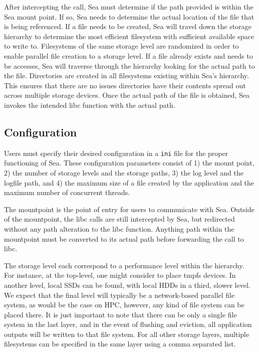 \documentclass{report}
\begin{document}
   After intercepting the call, Sea must determine if the path provided is within the
   Sea mount point. If so, Sea needs to determine the actual location of the file 
   that is being referenced. If a file needs to be created, Sea will travel
   down the storage hierarchy to determine the most efficient filesystem with sufficient
   available space to write to. Filesystems of the same storage level are randomized in
   order to enable parallel file creation to a storage level. If a file already
   exists and needs to be accesses, Sea will traverse through
   the hierarchy looking for the actual path to the file. Directories are created
   in all filesystems existing within Sea's hierarchy. This ensures that there are
   no issues directories have their contents spread out across multiple storage devices.
   Once the actual path of the file is obtained, Sea invokes the intended libc
   function with the actual path.

   \subsection{Configuration}\label{subs:configuration}
   Users must specify their desired configuration in a \texttt{ini} file for the
   proper functioning of Sea. These configuration parameters consist of 1) the
   mount point, 2) the number of storage levels and the storage paths, 3) the log level and
   the logfile path, and 4) the maximum size of a file created by the application and
   the maximum number of concurrent threads.


   The mountpoint is the point of entry for users to communicate with Sea. Outside of
   the mountpoint, the libc calls are still intercepted by Sea, but redirected without
   any path alteration to the libc function. Anything path within the mountpoint 
   must be converted to its actual path before forwarding the call to libc.


   The storage level each correspond to a performance level within the hierarchy. For
   instance, at the top-level, one might consider to place tmpfs devices. In another level,
   local SSDs can be found, with local HDDs in a third, slower level. We expect that the
   final level will typically be a network-based parallel file system, as would be the case
   on HPC, however, any kind of file system can be placed there. It is just important
   to note that there can be only a single file system in the last layer, and in the event
   of flushing and eviction, all application outputs will be written to that file system.
   For all other storage layers, multiple filesystems can be specified in the same
   layer using a comma separated list.
\end{document}
